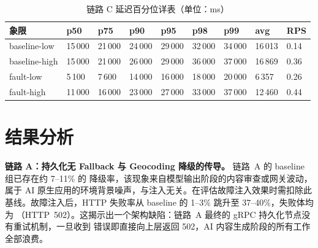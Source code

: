 \begin{table}[htbp]
  \centering
  \footnotesize
  \caption{链路 C 延迟百分位详表（单位：ms）}
  \label{tab:chainc-latency}
  \begin{tabularx}{\textwidth}{p{2.4cm}XXXXXXXX}
    \toprule
    象限 & p50 & p75 & p90 & p95 & p98 & p99 & avg & RPS \\
    \midrule
    baseline-low  & 15\,000 & 21\,000 & 24\,000 & 29\,000 & 32\,000 & 34\,000 & 16\,013 & 0.14 \\
    baseline-high & 15\,000 & 21\,000 & 26\,000 & 29\,000 & 36\,000 & 37\,000 & 16\,869 & 0.36 \\
    fault-low     &  5\,100 &  7\,600 & 14\,000 & 16\,000 & 18\,000 & 20\,000 &  6\,357 & 0.26 \\
    fault-high    & 11\,000 & 16\,000 & 23\,000 & 27\,000 & 33\,000 & 37\,000 & 12\,460 & 0.44 \\
    \bottomrule
  \end{tabularx}
\end{table}

\begin{table}[htbp]
  \centering
  \scriptsize
  \caption{链路 C 业务质量分组指标（†：单次挂起离群值，不具代表性）}
  \label{tab:chainc-quality}
\end{table}

\section{结果分析}

\noindent\textbf{链路 A：持久化无 Fallback 与 Geocoding 降级的传导。}
链路~A 的 baseline 组已存在约 7--11\% 的  降级率，该现象来自模型输出阶段的内容审查或网关波动，属于 AI 原生应用的环境背景噪声，与注入无关。在评估故障注入效果时需扣除此基线。故障注入后，HTTP 失败率从 baseline 的 1--3\% 跳升至 37--40\%，失败体均为 （HTTP~502）。这揭示出一个架构缺陷：链路~A 最终的 gRPC 持久化节点没有重试机制，一旦收到  错误即直接向上层返回 502，AI 内容生成阶段的所有工作全部浪费。

